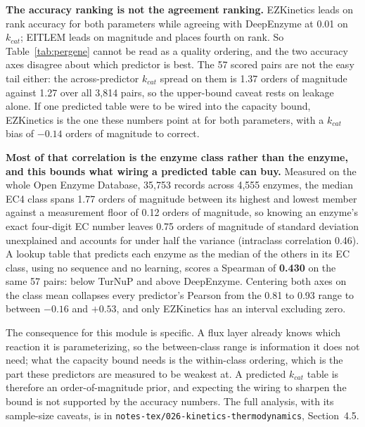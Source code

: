 \textbf{The accuracy ranking is not the agreement ranking.} EZKinetics leads on rank
accuracy for both parameters while agreeing with DeepEnzyme at 0.01 on $k_{cat}$; EITLEM
leads on magnitude and places fourth on rank. So Table~\ref{tab:pergene} cannot be read as
a quality ordering, and the two accuracy axes disagree about which predictor is best. The
57 scored pairs are not the easy tail either: the across-predictor $k_{cat}$ spread on them
is 1.37 orders of magnitude against 1.27 over all 3{,}814 pairs, so the upper-bound caveat rests on
leakage alone. If one predicted table were to be wired into the capacity bound, EZKinetics
is the one these numbers point at for both parameters, with a $k_{cat}$ bias of $-0.14$
orders of magnitude to correct.

\textbf{Most of that correlation is the enzyme class rather than the enzyme, and this
bounds what wiring a predicted table can buy.} Measured on the whole Open Enzyme Database,
35{,}753 records across 4{,}555 enzymes, the median EC4 class spans 1.77 orders of magnitude between
its highest and lowest member against a measurement floor of 0.12 orders of magnitude, so knowing an
enzyme's exact four-digit EC number leaves 0.75 orders of magnitude of standard deviation unexplained
and accounts for under half the variance (intraclass correlation 0.46). A lookup table
that predicts each enzyme as the median of the others in its EC class, using no sequence
and no learning, scores a Spearman of \textbf{0.430} on the same 57 pairs: below TurNuP and
above DeepEnzyme. Centering both axes on the class mean collapses every predictor's Pearson
from the 0.81 to 0.93 range to between $-0.16$ and $+0.53$, and only EZKinetics has an
interval excluding zero.

The consequence for this module is specific. A flux layer already knows which reaction it
is parameterizing, so the between-class range is information it does not need; what the
capacity bound needs is the within-class ordering, which is the part these predictors are
measured to be weakest at. A predicted $k_{cat}$ table is therefore an order-of-magnitude
prior, and expecting the wiring to sharpen the bound is not supported by the accuracy
numbers. The full analysis, with its sample-size caveats, is in
\texttt{notes-tex/026-kinetics-thermodynamics}, Section~4.5.
